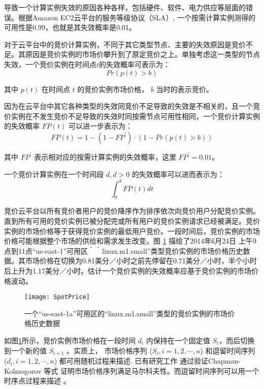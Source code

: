导致一个计算实例失效的原因各种各样，包括硬件、软件、电力供应等层面的错误。根据Amazon EC2云平台的服务等级协议（SLA）\cite{AWS_SLA:2014}, 一个按需计算实例测得的可用性是0.99，也就是其失效概率是0.01。

对于云平台中的竞价计算实例，不同于其它类型节点、主要的失效原因是竞价不足。其原因是竞价实例的市场价攀升到了原定竞价之上。单独考虑这一类型的节点失效，一个竞价实例在时间点$t$的失效概率可表示为：
\begin{equation}\label{eq_a_ob_instant}
Pr(p(t)>b)
\end{equation}

其中 $p(t)$ 在时间点 $t$ 的竞价实例市场价格， $b$ 当时的表示竞价。


因为在云平台中其它各种类型的失效同竞价不足导致的失效是不相关的，且一个竞价实例在不发生竞价不足导致的失效时同按需节点可用性相同，一个竞价计算实例的失效概率 $FP(t)$ 可以进一步表示为：
\begin{equation}\label{eq_a_instant}
FP(t) = 1 - (1 - FP^{\prime}) \cdot (1 - Pr(p(t)>b))
\end{equation}

其中 $FP^{\prime}$ 表示相对应的按需计算实例的失效概率，这里 $FP^{\prime} = 0.01$。

一个竞价计算实例在一个时间段 $d, d>0$ 的失效概率可以进而表示为：
\begin{equation}\label{eq_fpd}
\int_0^d FP(t)dt
\end{equation}

竞价云平台以所有竞价者用户的竞价降序作为排序依次向竞价用户分配竞价实例。直到所有可用的竞价实例已被分配完或所有用户的竞价实例请求已经被满足。竞价实例的市场价格等于获得竞价实例的最低用户竞价。一段时间后，竞价实例的市场价格可能根据整个市场的供给和需求发生改变。图 \ref{figure:sil} 描绘了2014年6月24日 上午9点到11点``us-east-1''可用区｀｀linux.m1.small''类型竞价实例的市场价格历史数据。其市场价格在切换为0.81美分／小时之前先停留在0.71美分／小时，半个小时后上升为1.17美分／小时。估计一个竞价实例的失效概率应基于竞价实例的市场价格波动。

\begin{figure}
  \centering
  \texttt{[image: SpotPrice]}
  \caption{一个``us-east-1a''可用区的``linux.m1.small''类型的竞价实例的市场价格历史数据}
  \label{figure:sil}
\end{figure}

如图\ref{figure:sil}所示，竞价实例市场价格在一段时间 $d_i$ 内保持在一个固定值 $S_{i}$，而后切换到一个新的值 $S_{i+1}$ 。实质上，
市场价格序列 ($S_i, i = 1, 2, \cdots, n$) 和逗留时间序列 ($d_i, i = 1, 2, \cdots, n$) 都可用随机过程来描述. 已有研究工作\cite{chohan2010see} 通过验证Chapman-Kolmogorov 等式 \cite{grimmett1992probability}证明市场价格序列满足马尔科夫性。而逗留时间序列可以用一个时序点过程来描述 \cite{eltit}。

